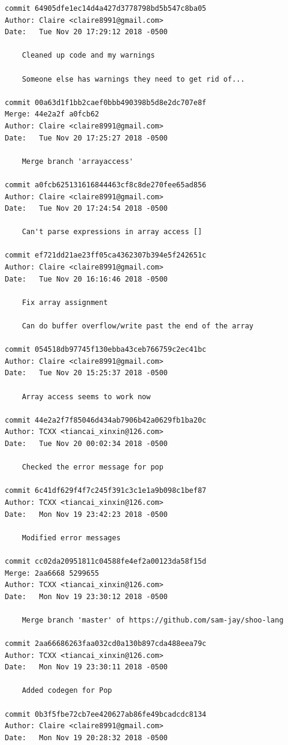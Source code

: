 \documentclass[12pt]{article}
\begin{document}
\begin{lstlisting}
commit 64905dfe1ec14d4a427d3778798bd5b547c8ba05
Author: Claire <claire8991@gmail.com>
Date:   Tue Nov 20 17:29:12 2018 -0500

    Cleaned up code and my warnings
    
    Someone else has warnings they need to get rid of...

commit 00a63d1f1bb2caef0bbb490398b5d8e2dc707e8f
Merge: 44e2a2f a0fcb62
Author: Claire <claire8991@gmail.com>
Date:   Tue Nov 20 17:25:27 2018 -0500

    Merge branch 'arrayaccess'

commit a0fcb625131616844463cf8c8de270fee65ad856
Author: Claire <claire8991@gmail.com>
Date:   Tue Nov 20 17:24:54 2018 -0500

    Can't parse expressions in array access []

commit ef721dd21ae23ff05ca4362307b394e5f242651c
Author: Claire <claire8991@gmail.com>
Date:   Tue Nov 20 16:16:46 2018 -0500

    Fix array assignment
    
    Can do buffer overflow/write past the end of the array

commit 054518db97745f130ebba43ceb766759c2ec41bc
Author: Claire <claire8991@gmail.com>
Date:   Tue Nov 20 15:25:37 2018 -0500

    Array access seems to work now

commit 44e2a2f7f85046d434ab7906b42a0629fb1ba20c
Author: TCXX <tiancai_xinxin@126.com>
Date:   Tue Nov 20 00:02:34 2018 -0500

    Checked the error message for pop

commit 6c41df629f4f7c245f391c3c1e1a9b098c1bef87
Author: TCXX <tiancai_xinxin@126.com>
Date:   Mon Nov 19 23:42:23 2018 -0500

    Modified error messages

commit cc02da20951811c04588fe4ef2a00123da58f15d
Merge: 2aa6668 5299655
Author: TCXX <tiancai_xinxin@126.com>
Date:   Mon Nov 19 23:30:12 2018 -0500

    Merge branch 'master' of https://github.com/sam-jay/shoo-lang

commit 2aa66686263faa032cd0a130b897cda488eea79c
Author: TCXX <tiancai_xinxin@126.com>
Date:   Mon Nov 19 23:30:11 2018 -0500

    Added codegen for Pop

commit 0b3f5fbe72cb7ee420627ab86fe49bcadcdc8134
Author: Claire <claire8991@gmail.com>
Date:   Mon Nov 19 20:28:32 2018 -0500


\end{lstlisting}
\end{document}
